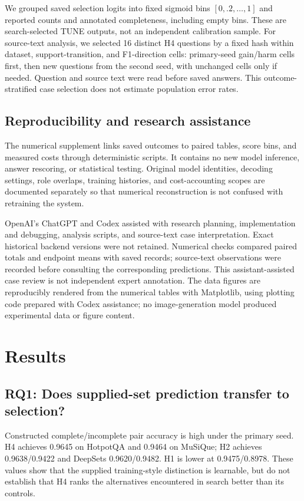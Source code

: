 \documentclass[preprint,12pt]{elsarticle}
\begin{document}
We grouped saved selection logits into fixed sigmoid bins $[0,.2,\ldots,1]$ and reported counts and annotated completeness, including empty bins. These are search-selected TUNE outputs, not an independent calibration sample. For source-text analysis, we selected 16 distinct H4 questions by a fixed hash within dataset, support-transition, and F1-direction cells: primary-seed gain/harm cells first, then new questions from the second seed, with unchanged cells only if needed. Question and source text were read before saved answers. This outcome-stratified case selection does not estimate population error rates.

\subsection{Reproducibility and research assistance}
The numerical supplement links saved outcomes to paired tables, score bins, and measured costs through deterministic scripts. It contains no new model inference, answer rescoring, or statistical testing. Original model identities, decoding settings, role overlaps, training histories, and cost-accounting scopes are documented separately so that numerical reconstruction is not confused with retraining the system.

OpenAI's ChatGPT and Codex assisted with research planning, implementation and debugging, analysis scripts, and source-text case interpretation. Exact historical backend versions were not retained. Numerical checks compared paired totals and endpoint means with saved records; source-text observations were recorded before consulting the corresponding predictions. This assistant-assisted case review is not independent expert annotation. The data figures are reproducibly rendered from the numerical tables with Matplotlib, using plotting code prepared with Codex assistance; no image-generation model produced experimental data or figure content.

\section{Results}
\subsection{RQ1: Does supplied-set prediction transfer to selection?}
Constructed complete/incomplete pair accuracy is high under the primary seed. H4 achieves 0.9645 on HotpotQA and 0.9464 on MuSiQue; H2 achieves 0.9638/0.9422 and DeepSets 0.9620/0.9482. H1 is lower at 0.9475/0.8978. These values show that the supplied training-style distinction is learnable, but do not establish that H4 ranks the alternatives encountered in search better than its controls.
\end{document}
